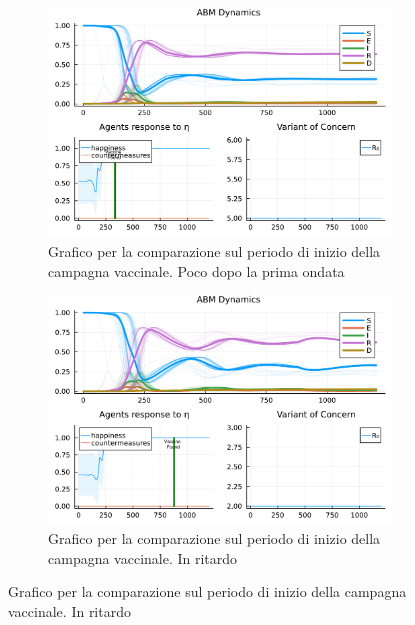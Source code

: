 \begin{figure}[!hb]
\begin{subfigure}[b]{0.45\textwidth}
		\includegraphics[width=\textwidth]{img/SocialNetworkABM_5_V.pdf}
		\caption{Grafico per la comparazione sul periodo di inizio della campagna vaccinale. Poco dopo la prima ondata}
		\label{fig:comparison_vax_3}
	\end{subfigure}
	\hfill
	\begin{subfigure}[b]{0.45\textwidth}
		\centering
		\includegraphics[width=\textwidth]{img/SocialNetworkABM_2_V.pdf}
		\caption{Grafico per la comparazione sul periodo di inizio della campagna vaccinale. In ritardo}
		\label{fig:comparison_vax_4}
	\end{subfigure}
\end{figure}